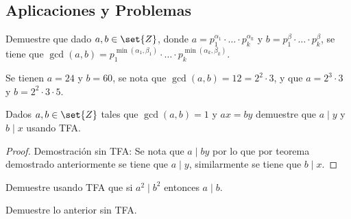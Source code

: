 \documentclass{ayudantia}
\begin{document}
\subsection{Aplicaciones y Problemas}
\begin{prob}
    Demuestre que dado \(a,b\in\set{Z}\), donde \(a=p_1^{\alpha_1}\cdot\ldots\cdot p_k^{\alpha_k}\) y \(b=p_1^{\beta}\cdot\ldots\cdot p_k^{\beta}\), se tiene que \(\gcd(a,b)=p_1^{\min(\alpha_1,\beta_1)}\cdot\ldots\cdot p_k^{\min(\alpha_k,\beta_k)}\).
\end{prob}
\begin{ejm}
    Se tienen \(a=24\) y \(b=60\), se nota que \(\gcd(a,b)=12=2^2\cdot 3\), y que \(a=2^3\cdot 3\) y \(b=2^2\cdot3\cdot5\).
\end{ejm}
\begin{prob}
    Dados \(a,b\in\set{Z}\) tales que \(\gcd(a,b)=1\) y \(ax=by\) demuestre que \(a\mid y\) y \(b\mid x\) usando TFA.
\end{prob}
\begin{proof}
    Demostración sin TFA: Se nota que \(a\mid by\) por lo que por teorema demostrado anteriormente se tiene que \(a\mid y\), similarmente se tiene que \(b\mid x\).
\end{proof}
\begin{prob}
    Demuestre usando TFA que si \(a^2\mid b^2\) entonces \(a\mid b\).
\end{prob}


\begin{prob}
    Demuestre lo anterior sin TFA.
\end{prob}


\end{document}
